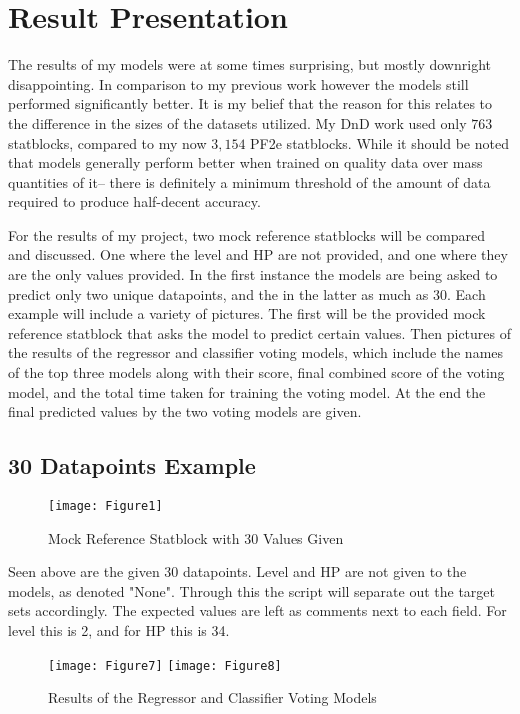 \documentclass[11pt]{article}
\begin{document}
\section{Result Presentation}

The results of my models were at some times surprising, but mostly downright disappointing. In comparison to my previous work \cite{vess-dev_2022} however the models still performed significantly better. It is my belief that the reason for this relates to the difference in the sizes of the datasets utilized. My DnD work used only $763$ statblocks, compared to my now $3,154$ PF2e statblocks. While it should be noted that models generally perform better when trained on quality data over mass quantities of it-- there is definitely a minimum threshold of the amount of data required to produce half-decent accuracy.

For the results of my project, two mock reference statblocks will be compared and discussed. One where the level and HP are not provided, and one where they are the only values provided. In the first instance the models are being asked to predict only two unique datapoints, and the in the latter as much as 30. Each example will include a variety of pictures. The first will be the provided mock reference statblock that asks the model to predict certain values. Then pictures of the results of the regressor and classifier voting models, which include the names of the top three models along with their score, final combined score of the voting model, and the total time taken for training the voting model. At the end the final predicted values by the two voting models are given.

\subsection{30 Datapoints Example}

\begin{figure}[H]
    \centering
    \texttt{[image: Figure1]}
    \caption{Mock Reference Statblock with 30 Values Given}
    \label{fig:my_label}
\end{figure}

Seen above are the given 30 datapoints. Level and HP are not given to the models, as denoted "None". Through this the script will separate out the target sets accordingly. The expected values are left as comments next to each field. For level this is 2, and for HP this is 34.

\begin{figure}[H]
    \centering
    \texttt{[image: Figure7]}
    \texttt{[image: Figure8]}
    \caption{Results of the Regressor and Classifier Voting Models}
\end{figure}
\end{document}
